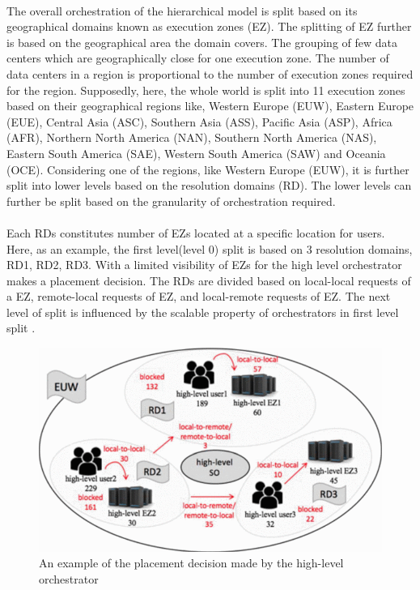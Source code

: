 \paragraph{}The overall orchestration of the hierarchical model is split based on its geographical domains known as execution zones (EZ). The splitting of EZ further is based on the geographical area the domain covers. The grouping of few data centers which are geographically close for one execution zone. The number of data centers in a region is proportional to the number of execution zones required for the region. Supposedly, here, the whole world is split into 11 execution zones based on their geographical regions like, Western Europe (EUW), Eastern Europe (EUE), Central Asia (ASC), Southern Asia (ASS), Pacific Asia (ASP), Africa (AFR), Northern North America (NAN), Southern North America (NAS), Eastern South America (SAE), Western South America (SAW) and Oceania (OCE). Considering one of the regions, like Western Europe (EUW), it is further split into lower levels based on the resolution domains (RD). The lower levels can further be split based on the granularity of orchestration required\cite{maini2016hierarchical}.

\paragraph{}Each RDs constitutes number of EZs located at a specific location for users. Here, as an example, the first level(level 0)  split is based on 3 resolution domains, RD1, RD2, RD3. With a limited visibility of EZs for the high level orchestrator makes a placement decision. The RDs are divided based on local-local requests of a EZ, remote-local requests of EZ, and local-remote requests of EZ. The next level of split is influenced by the scalable property of orchestrators in first level split \cite{maini2016hierarchical}.

\begin{figure}
	\centering
	\includegraphics[width=0.7\linewidth]{figures/HO}
	\caption{An example of the placement decision made by the high-level orchestrator \cite{maini2016hierarchical}}
	\label{fig:ho}
\end{figure}

